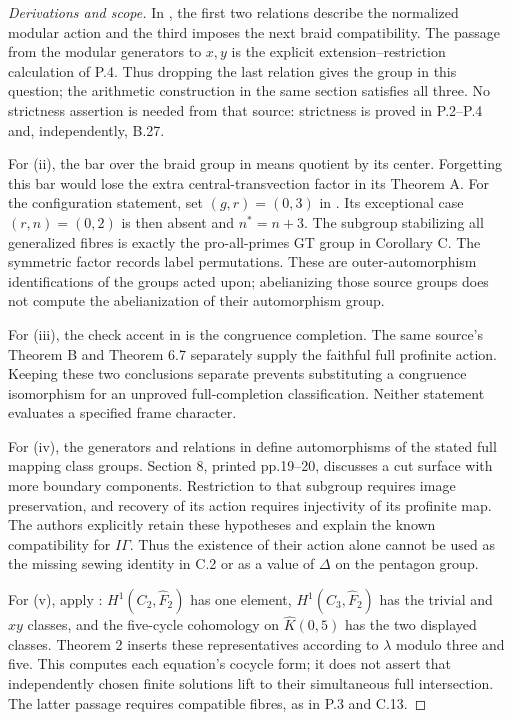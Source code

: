 \begin{proof}[Derivations and scope]
In \cite[\S4, equations (4.3), (4.4), (4.10), (4.14)]{ROOT_Drinfeld1990},
the first two relations describe the normalized modular
action and the third imposes the next braid compatibility.
The passage from the modular generators to $x,y$ is the
explicit extension--restriction calculation of P.4.
Thus dropping the last relation gives the group in this
question; the arithmetic construction in the same section
satisfies all three. No strictness assertion is needed
from that source: strictness is proved in P.2--P.4 and,
independently, B.27.

For (ii), the bar over the braid group in
\cite[Theorem B = Theorem 4.3 and Corollary C]{ROOT_MN2019}
means quotient by its center. Forgetting this bar would
lose the extra central-transvection factor in its Theorem A.
For the configuration statement, set $(g,r)=(0,3)$ in
\cite[Corollaries B and C, pp.3--4]{ROOT_HMM2017}.
Its exceptional case $(r,n)=(0,2)$ is then absent and
$n^*=n+3$. The subgroup stabilizing all generalized
fibres is exactly the pro-all-primes GT group in Corollary C.
The symmetric factor records label permutations. These
are outer-automorphism identifications of the groups
acted upon; abelianizing those source groups does not
compute the abelianization of their automorphism group.

For (iii), the check accent in
\cite[Theorem A = Theorem 6.1]{ROOT_Boggi2026}
is the congruence completion. The same source's
Theorem B and Theorem 6.7 separately supply the faithful
full profinite action. Keeping these two conclusions
separate prevents substituting a congruence isomorphism
for an unproved full-completion classification.
Neither statement evaluates a specified frame character.

For (iv), the generators and relations in
\cite[Theorem 1.1]{ROOT_LNS2026} define automorphisms
of the stated full mapping class groups. Section 8,
printed pp.19--20, discusses a cut surface with more
boundary components. Restriction to that subgroup
requires image preservation, and recovery of its action
requires injectivity of its profinite map. The authors
explicitly retain these hypotheses and explain the
known compatibility for $I\Gamma$.
Thus the existence of their action alone cannot be used
as the missing sewing identity in C.2 or as a value of
$\Delta$ on the pentagon group.

For (v), apply \cite[Proposition 3 and Theorem 2]{PBC_LS1997}:
$H^1(C_2,\widehat F_2)$ has one element,
$H^1(C_3,\widehat F_2)$ has the trivial and $xy$ classes,
and the five-cycle cohomology on $\widehat K(0,5)$ has
the two displayed classes. Theorem 2 inserts these
representatives according to $\lambda$ modulo three
and five. This computes each equation's cocycle form;
it does not assert that independently chosen finite
solutions lift to their simultaneous full intersection.
The latter passage requires compatible fibres, as
in P.3 and C.13.


\end{proof}
